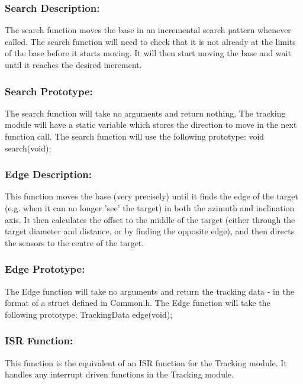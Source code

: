\documentclass[]{article}
\begin{document}
\subsubsection{Search Description:}
The search function moves the base in an incremental search pattern whenever called. The search function will need to check that it is not already at the limits of the base before it starts moving. It will then start moving the base and wait until it reaches the desired increment.

\subsubsection{Search Prototype:}
The search function will take no arguments and return nothing. The tracking module will have a static variable which stores the direction to move in the next function call. The search function will use the following prototype: \newline \newline
void search(void);

\subsubsection{Edge Description:}
This function moves the base (very precisely) until it finds the edge of the target (e.g. when it can no longer 'see' the target) in both the azimuth and inclination axis. It then calculates the offset to the middle of the target (either through the target diameter and distance, or by finding the opposite edge), and then directs the sensors to the centre of the target.

\subsubsection{Edge Prototype:}
The Edge function will take no arguments and return the tracking data - in the format of a struct defined in Common.h. The Edge function will take the following prototype: \newline \newline
TrackingData edge(void);

\subsubsection{ISR Function:}
This function is the equivalent of an ISR function for the Tracking module. It handles any interrupt driven functions in the Tracking module.
\end{document}
